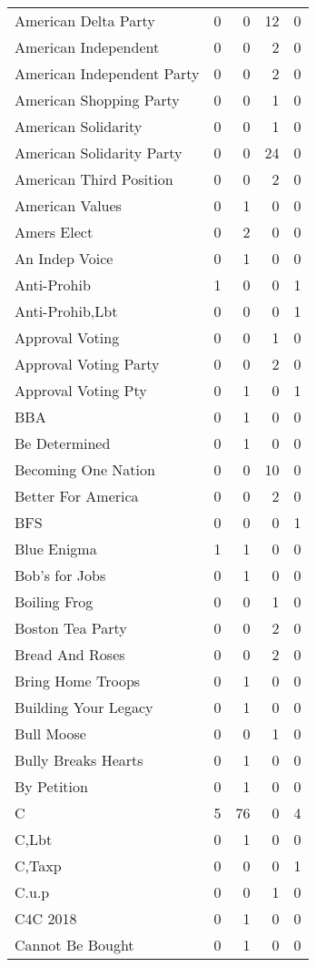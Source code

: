 \begin{supertabular}{lrrrr}
American Delta Party & 0 & 0 & 12 & 0\\
American Independent & 0 & 0 & 2 & 0\\
American Independent Party & 0 & 0 & 2 & 0\\
American Shopping Party & 0 & 0 & 1 & 0\\
American Solidarity & 0 & 0 & 1 & 0\\
American Solidarity Party & 0 & 0 & 24 & 0\\
American Third Position & 0 & 0 & 2 & 0\\
American Values & 0 & 1 & 0 & 0\\
Amers Elect & 0 & 2 & 0 & 0\\
An Indep Voice & 0 & 1 & 0 & 0\\
Anti-Prohib & 1 & 0 & 0 & 1\\
Anti-Prohib,Lbt & 0 & 0 & 0 & 1\\
Approval Voting & 0 & 0 & 1 & 0\\
Approval Voting Party & 0 & 0 & 2 & 0\\
Approval Voting Pty & 0 & 1 & 0 & 1\\
BBA & 0 & 1 & 0 & 0\\
Be Determined & 0 & 1 & 0 & 0\\
Becoming One Nation & 0 & 0 & 10 & 0\\
Better For America & 0 & 0 & 2 & 0\\
BFS & 0 & 0 & 0 & 1\\
Blue Enigma & 1 & 1 & 0 & 0\\
Bob's for Jobs & 0 & 1 & 0 & 0\\
Boiling Frog & 0 & 0 & 1 & 0\\
Boston Tea Party & 0 & 0 & 2 & 0\\
Bread And Roses & 0 & 0 & 2 & 0\\
Bring Home Troops & 0 & 1 & 0 & 0\\
Building Your Legacy & 0 & 1 & 0 & 0\\
Bull Moose & 0 & 0 & 1 & 0\\
Bully Breaks Hearts & 0 & 1 & 0 & 0\\
By Petition & 0 & 1 & 0 & 0\\
C & 5 & 76 & 0 & 4\\
C,Lbt & 0 & 1 & 0 & 0\\
C,Taxp & 0 & 0 & 0 & 1\\
C.u.p & 0 & 0 & 1 & 0\\
C4C 2018 & 0 & 1 & 0 & 0\\
Cannot Be Bought & 0 & 1 & 0 & 0\\

\end{supertabular}
